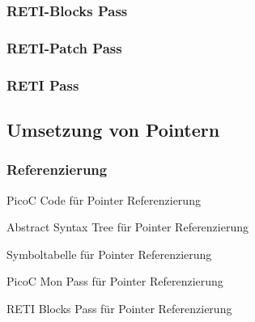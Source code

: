 \subsubsection{RETI-Blocks Pass}
\subsubsection{RETI-Patch Pass}
\subsubsection{RETI Pass}

\subsection{Umsetzung von Pointern}
\subsubsection{Referenzierung}
\begin{code}
  \centering
  \caption{PicoC Code für Pointer Referenzierung}
  \label{code:picoc_code_für_pointer_referenzierung}
\end{code}

\begin{code}
  \centering
  \caption{Abstract Syntax Tree für Pointer Referenzierung}
  \label{code:abstract_syntax_tree_für_pointer_referenzierung}
\end{code}

\begin{code}
  \centering
  \caption{Symboltabelle für Pointer Referenzierung}
  \label{code:symboltabelle_für_pointer_referenzierung}
\end{code}

\begin{code}
  \centering
  \caption{PicoC Mon Pass für Pointer Referenzierung}
  \label{code:picoc_mon_für_pointer_referenzierung}
\end{code}

\begin{code}
  \centering
  \caption{RETI Blocks Pass für Pointer Referenzierung}
  \label{code:reti_blocks_für_pointer_referenzierung}
\end{code}
